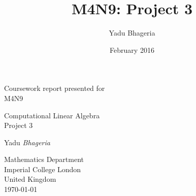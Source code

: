 \documentclass{article}
\title{M4N9: Project 3}
\author{Yadu Bhageria}
\date{February 2016}
\begin{document}
\lstset{language=Matlab}

\begin{titlepage}
    \begin{center}
    
        Coursework report presented for\\
        M4N9
        
        \vfill
        
        {\Huge Computational Linear Algebra\\ Project 3}
        
        
        \vspace{0.5cm}
        
        \vspace{1.5cm}
        
        {\Large Yadu \emph{Bhageria}}
        
        \vfill
        
        Mathematics Department\\
        Imperial College London\\
        United Kingdom\\
        \today
        
    \end{center}
\end{titlepage}
\end{document}
